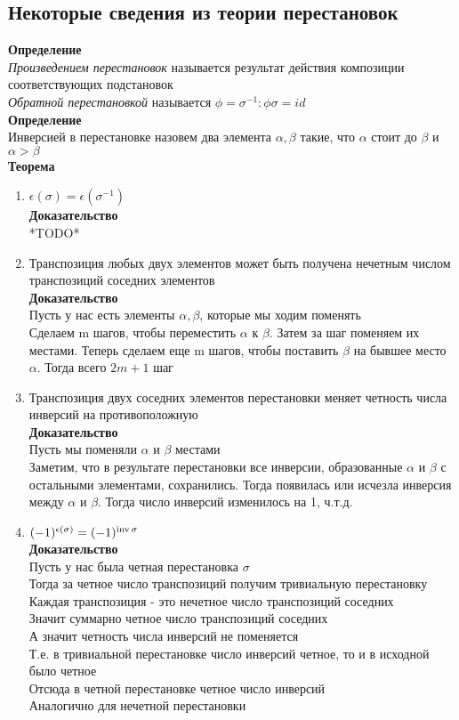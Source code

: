 \documentclass[12pt]{article}
\begin{document}
\subsection{Некоторые сведения из теории перестановок}
\textbf{Определение}\\
\textit{Произведением перестановок} называется результат действия композиции соответствующих подстановок\\
\textit{Обратной перестановкой} называется $\phi = \sigma^{-1}: \phi\sigma = id$\\
\textbf{Определение}\\
Инверсией в перестановке назовем два элемента $\alpha, \beta$ такие, что $\alpha$ стоит до $\beta$ и $\alpha > \beta$\\
\textbf{Теорема}
\begin{enumerate}
    \item $\epsilon(\sigma) = \epsilon(\sigma^{-1})$\\
    \textbf{Доказательство}\\
    *TODO*
    \item Транспозиция любых двух элементов может быть получена нечетным числом транспозиций соседних элементов\\
    \textbf{Доказательство}\\
    Пусть у нас есть элементы $\alpha, \beta$, которые мы ходим поменять\\
    Сделаем m шагов, чтобы переместить $\alpha$ к $\beta$. Затем за шаг поменяем их местами. Теперь сделаем еще m шагов, чтобы поставить $\beta$ на бывшее место $\alpha$. Тогда всего $2m+1$ шаг
    \item Транспозиция двух соседних элементов перестановки меняет четность числа инверсий на противоположную\\
    \textbf{Доказательство}\\
    Пусть мы поменяли $\alpha$ и $\beta$ местами\\
    Заметим, что в результате перестановки все инверсии, образованные $\alpha$ и $\beta$ с остальными элементами, сохранились. Тогда появилась или исчезла инверсия между $\alpha$ и $\beta$. Тогда число инверсий изменилось на 1, ч.т.д.
    \item $(-1)^{\epsilon(\sigma)} = (-1)^{\operatorname{inv}\sigma}$\\
    \textbf{Доказательство}\\
    Пусть у нас была четная перестановка $\sigma$\\
    Тогда за четное число транспозиций получим тривиальную перестановку\\
    Каждая транспозиция - это нечетное число транспозиций соседних\\
    Значит суммарно четное число транспозиций соседних\\
    А значит четность числа инверсий не поменяется\\
    Т.е. в тривиальной перестановке число инверсий четное, то и в исходной было четное\\
    Отсюда в четной перестановке четное число инверсий\\
    Аналогично для нечетной перестановки
\end{enumerate}
\end{document}
